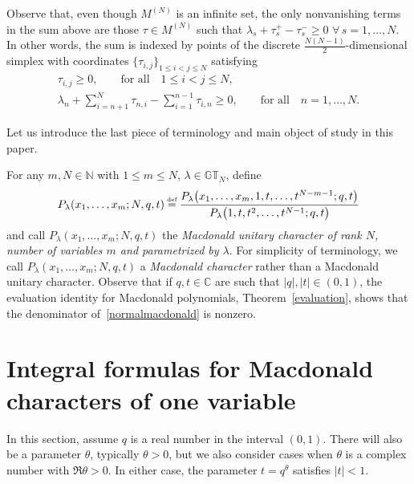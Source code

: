 \documentclass[pdftex]{sigma}
\numberwithin{equation}{section}
\newcommand\myeq{\mathrel{\stackrel{\makebox[0pt]{\mbox{\normalfont\tiny def}}}{=}}}
\newcommand{\C}{\mathbb{C}}
\newcommand{\N}{\mathbb{N}}
\newcommand{\GT}{\mathbb{GT}}
\begin{document}
\begin{rem}
Observe that, even though $M^{(N)}$ is an inf\/inite set, the only nonvanishing terms in the sum above are those $\tau\in M^{(N)}$ such that $\lambda_s + \tau_s^+ - \tau_s^- \geq 0$ $\forall\, s = 1, \dots, N$. In other words, the sum is indexed by points of the discrete $\frac{N(N-1)}{2}$-dimensional simplex with coordinates $\{\tau_{i, j}\}_{1\leq i<j\leq N}$ satisfying
\begin{gather*}
\tau_{i, j} \geq 0,\qquad \textrm{for all} \quad 1\leq i < j\leq N,\\
\lambda_n + \sum_{i=n+1}^N{\tau_{n, i}} - \sum_{i=1}^{n - 1}{\tau_{i, n}} \geq 0, \qquad \textrm{for all} \quad n = 1, \dots, N.
\end{gather*}
\end{rem}

Let us introduce the last piece of terminology and main object of study in this paper.

\begin{df}
For any $m, N\in\N$ with $1\leq m\leq N$, $\lambda\in\GT_N$, def\/ine
\begin{gather}\label{normalmacdonald}
P_{\lambda}(x_1, \dots, x_m; N, q, t) \myeq \frac{P_{\lambda}\big(x_1, \dots, x_m, 1, t, \dots, t^{N-m-1}; q, t\big)}{P_{\lambda}\big(1, t, t^2, \dots, t^{N-1}; q, t\big)}
\end{gather}
and call $P_{\lambda}(x_1, \dots, x_m; N, q, t)$ the \textit{Macdonald unitary character of rank $N$, number of variables $m$ and parametrized by $\lambda$}.
For simplicity of terminology, we call $P_{\lambda}(x_1, \dots, x_m; N, q, t)$ a \textit{Macdonald character} rather than a Macdonald unitary character. Observe that if $q, t \in \C$ are such that $|q|, |t|\in (0, 1)$, the evaluation identity for Macdonald polynomials, Theorem~\ref{evaluation}, shows that the denominator of~\eqref{normalmacdonald} is nonzero.
\end{df}

\section{Integral formulas for Macdonald characters of one variable}\label{macdonaldintegralsec}


In this section, assume $q$ is a real number in the interval $(0, 1)$. There will also be a parameter $\theta$, typically $\theta > 0$, but we also consider cases when $\theta$ is a complex number with $\Re\theta > 0$. In either case, the parameter $t = q^{\theta}$ satisf\/ies $|t| < 1$.
\end{document}

